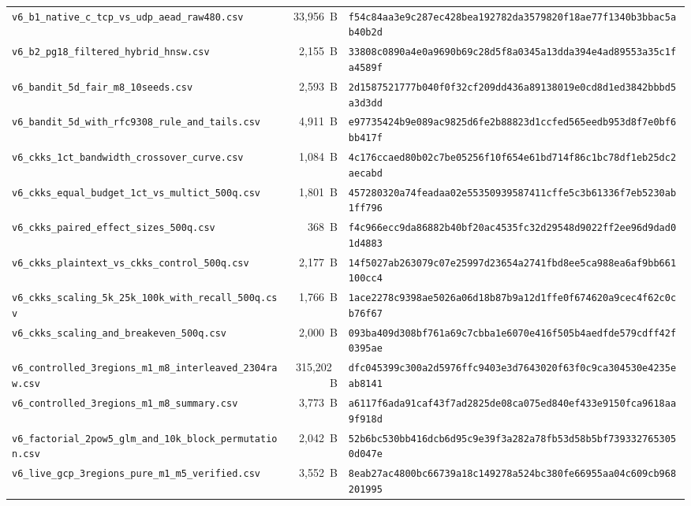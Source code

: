 \documentclass[10pt,journal,compsoc]{IEEEtran}
\begin{document}
\begin{table}[!ht]
{\begin{tabular}{@{}lrl@{}}
\texttt{v6\_b1\_native\_c\_tcp\_vs\_udp\_aead\_raw480.csv} & 33,956~B & \texttt{f54c84aa3e9c287ec428bea192782da3579820f18ae77f1340b3bbac5ab40b2d} \\
\texttt{v6\_b2\_pg18\_filtered\_hybrid\_hnsw.csv} & 2,155~B & \texttt{33808c0890a4e0a9690b69c28d5f8a0345a13dda394e4ad89553a35c1fa4589f} \\
\texttt{v6\_bandit\_5d\_fair\_m8\_10seeds.csv} & 2,593~B & \texttt{2d1587521777b040f0f32cf209dd436a89138019e0cd8d1ed3842bbbd5a3d3dd} \\
\texttt{v6\_bandit\_5d\_with\_rfc9308\_rule\_and\_tails.csv} & 4,911~B & \texttt{e97735424b9e089ac9825d6fe2b88823d1ccfed565eedb953d8f7e0bf6bb417f} \\
\texttt{v6\_ckks\_1ct\_bandwidth\_crossover\_curve.csv} & 1,084~B & \texttt{4c176ccaed80b02c7be05256f10f654e61bd714f86c1bc78df1eb25dc2aecabd} \\
\texttt{v6\_ckks\_equal\_budget\_1ct\_vs\_multict\_500q.csv} & 1,801~B & \texttt{457280320a74feadaa02e55350939587411cffe5c3b61336f7eb5230ab1ff796} \\
\texttt{v6\_ckks\_paired\_effect\_sizes\_500q.csv} & 368~B & \texttt{f4c966ecc9da86882b40bf20ac4535fc32d29548d9022ff2ee96d9dad01d4883} \\
\texttt{v6\_ckks\_plaintext\_vs\_ckks\_control\_500q.csv} & 2,177~B & \texttt{14f5027ab263079c07e25997d23654a2741fbd8ee5ca988ea6af9bb661100cc4} \\
\texttt{v6\_ckks\_scaling\_5k\_25k\_100k\_with\_recall\_500q.csv} & 1,766~B & \texttt{1ace2278c9398ae5026a06d18b87b9a12d1ffe0f674620a9cec4f62c0cb76f67} \\
\texttt{v6\_ckks\_scaling\_and\_breakeven\_500q.csv} & 2,000~B & \texttt{093ba409d308bf761a69c7cbba1e6070e416f505b4aedfde579cdff42f0395ae} \\
\texttt{v6\_controlled\_3regions\_m1\_m8\_interleaved\_2304raw.csv} & 315,202~B & \texttt{dfc045399c300a2d5976ffc9403e3d7643020f63f0c9ca304530e4235eab8141} \\
\texttt{v6\_controlled\_3regions\_m1\_m8\_summary.csv} & 3,773~B & \texttt{a6117f6ada91caf43f7ad2825de08ca075ed840ef433e9150fca9618aa9f918d} \\
\texttt{v6\_factorial\_2pow5\_glm\_and\_10k\_block\_permutation.csv} & 2,042~B & \texttt{52b6bc530bb416dcb6d95c9e39f3a282a78fb53d58b5bf7393327653050d047e} \\
\texttt{v6\_live\_gcp\_3regions\_pure\_m1\_m5\_verified.csv} & 3,552~B & \texttt{8eab27ac4800bc66739a18c149278a524bc380fe66955aa04c609cb968201995} \\

\end{tabular}}
\end{table}
\end{document}
